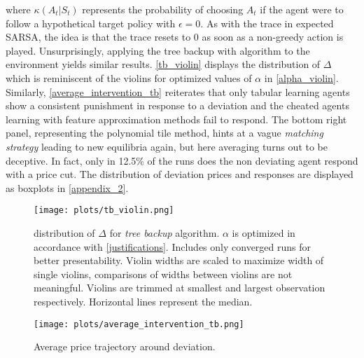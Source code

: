 where $\kappa(A_t | S_t)$ represents the probability of choosing $A_t$ if the agent were to follow a hypothetical target policy with $\epsilon= 0$. As with the trace in expected SARSA, the idea is that the trace resets to 0 as soon as a non-greedy action is played. Unsurprisingly, applying the tree backup with algorithm to the environment yields similar results. \autoref{tb_violin} displays the distribution of $\Delta$ which is reminiscent of the violins for optimized values of $\alpha$ in \autoref{alpha_violin}. Similarly,  \autoref{average_intervention_tb} reiterates that only tabular learning agents show a consistent punishment in response to a deviation and the cheated agents learning with feature approximation methods fail to respond. The bottom right panel, representing the polynomial tile method, hints at a vague \emph{matching strategy} leading to new equilibria again, but here averaging turns out to be deceptive. In fact, only in 12.5\% of the runs does the non deviating agent respond with a price cut. The distribution of deviation prices and responses are displayed as boxplots in \autoref{appendix_2}.

\begin{figure}
	\texttt{[image: plots/tb\_violin.png]}
	\caption{distribution of $\Delta$ for \emph{tree backup} algorithm. $\alpha$ is optimized in accordance with \autoref{justifications}. Includes only converged runs for better presentability. Violin widths are scaled to maximize width of single violins, comparisons of widths between violins are not meaningful. Violins are trimmed at smallest and largest observation respectively. Horizontal lines represent the median.}
	\label{tb_violin}
\end{figure}

\begin{figure}
	\texttt{[image: plots/average\_intervention\_tb.png]}
	\caption{Average price trajectory around deviation.}
	\label{average_intervention_tb}
\end{figure}

